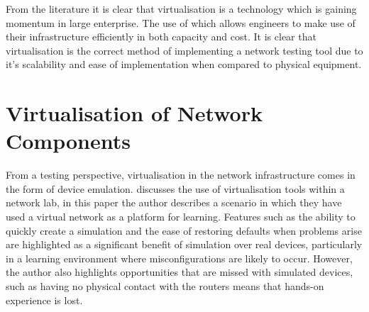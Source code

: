 \documentclass[11pt]{report}
\begin{document}

From the literature it is clear that virtualisation is a technology which is gaining momentum in large enterprise. The use of which allows engineers to make use of their infrastructure efficiently in both capacity and cost. It is clear that virtualisation is the correct method of implementing a network testing tool due to it's scalability and ease of implementation when compared to physical equipment. 

\section{Virtualisation of Network Components}

From a testing perspective, virtualisation in the network infrastructure comes in the form of device emulation. \citep{galan2004use} discusses the use of virtualisation tools within a network lab, 
in this paper the author describes a scenario in which they have used a virtual network as a platform for learning. Features such as the ability to quickly create a simulation and the ease of restoring defaults when problems arise are highlighted as a significant benefit of simulation over real devices, particularly in a learning environment where misconfigurations are likely to occur. However, the author also highlights opportunities that are missed with simulated devices, such as having no physical contact with the routers means that hands-on experience is lost.
\end{document}
